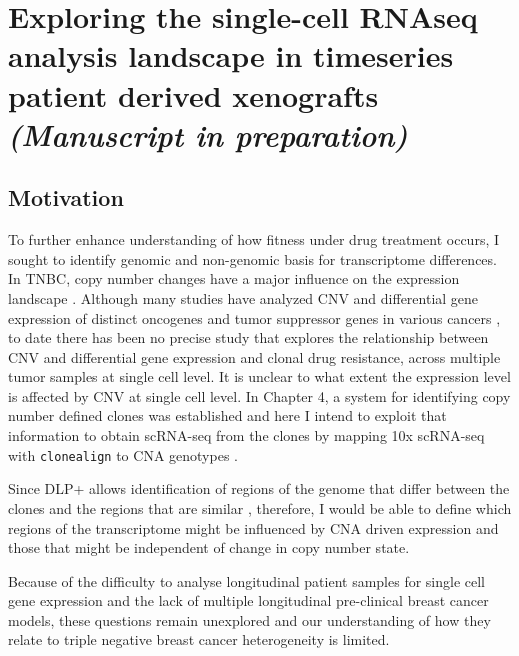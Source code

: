 
{\chapter{Exploring the single-cell RNAseq analysis landscape in timeseries patient derived xenografts 
\\
\textit{(Manuscript in preparation)}}}

 \label{ch:Chapter5}


 \section{Motivation}


To further enhance understanding of how fitness under drug treatment occurs, I sought to identify genomic and non-genomic basis for transcriptome differences. 
In TNBC, copy number changes have a major influence on the expression landscape \cite{wang2016integrative}.
Although many studies have analyzed CNV and differential gene expression of distinct oncogenes and tumor suppressor genes in various cancers \cite{kuzyk2015mycn, budczies2016pan, kwak2015fibroblast}, to date there has been no precise study that explores the relationship between CNV and differential gene expression and clonal drug resistance,  across multiple tumor samples at single cell level. It is unclear to what extent the expression level is affected by CNV at single cell level.
In Chapter 4, a system for identifying copy number defined clones was established and here I intend to exploit that information to obtain scRNA-seq from the clones by mapping 10x scRNA-seq with \texttt{clonealign} to CNA genotypes \cite{campbell2019clonealign}.

Since \ac{DLP+} allows identification of regions of the genome that differ between the clones and the regions that are similar \cite{laks2019clonal}, therefore, I would be able to define which regions of the transcriptome might be influenced by CNA driven expression and those that might be independent of change in copy number state.

Because of the difficulty to analyse longitudinal patient samples for single cell gene expression and the lack of multiple longitudinal pre-clinical breast cancer models, these questions remain unexplored and our understanding of how they relate to triple negative breast cancer heterogeneity is limited.

